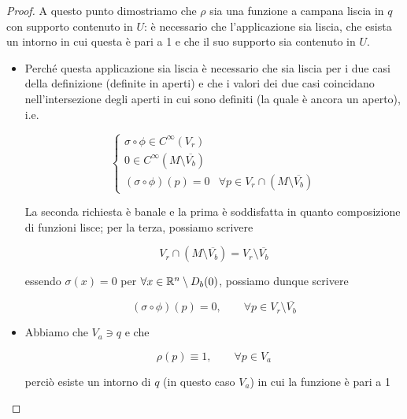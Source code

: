 \begin{proof}
	A questo punto dimostriamo che $ \rho $ sia una funzione a campana liscia in $ q $ con supporto contenuto in $ U $: è necessario che l'applicazione sia liscia, che esista un intorno in cui questa è pari a 1 e che il suo supporto sia contenuto in $ U $.
	
	\begin{itemize}
		\item Perché questa applicazione sia liscia è necessario che sia liscia per i due casi della definizione (definite in aperti) e che i valori dei due casi coincidano nell'intersezione degli aperti in cui sono definiti (la quale è ancora un aperto), i.e.
		
		\begin{equation}
			\begin{cases}
				\sigma \circ \phi \in C^{\infty}(V_{r})\\
				0 \in C^{\infty} \left( M \setminus \overline{V_{b}} \right)\\
				(\sigma \circ \phi)(p) = 0 & \forall p \in V_{r} \cap (M \setminus \overline{V_{b}})
			\end{cases}
		\end{equation}
		
		La seconda richiesta è banale e la prima è soddisfatta in quanto composizione di funzioni lisce; per la terza, possiamo scrivere
		
		\begin{equation}
			V_{r} \cap \left( M \setminus \overline{V_{b}} \right) = V_{r} \setminus \overline{V_{b}}
		\end{equation}
		
		essendo $ \sigma(x) = 0 $ per $ \forall x \in \mathbb{R}^{n} \setminus D_{b}(0) $, possiamo dunque scrivere
		
		\begin{equation}
			(\sigma \circ \phi)(p) = 0, \qquad \forall p \in V_{r} \setminus \overline{V_{b}}
		\end{equation}
		
		
		\item Abbiamo che $ V_{a} \ni q $ e che
		
		\begin{equation}
			\rho(p) \equiv 1, \qquad \forall p \in V_{a}
		\end{equation}
	
		perciò esiste un intorno di $ q $ (in questo caso $ V_{a} $) in cui la funzione è pari a 1
		
		

\end{itemize}
\end{proof}
